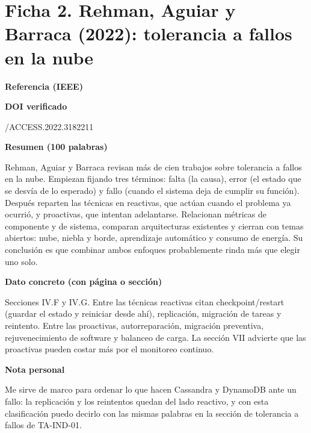 \documentclass[11pt,a4paper]{article}
\newcommand{\campo}[1]{\par\medskip\noindent\textbf{#1}\par\smallskip}
\begin{document}
	\newpage \section*{Ficha 2. Rehman, Aguiar y Barraca (2022): tolerancia a fallos en la nube}
	\campo{Referencia (IEEE)}
	\campo{DOI verificado}
	10.1109/ACCESS.2022.3182211
	\campo{Resumen (100 palabras)}
	Rehman, Aguiar y Barraca revisan más de cien trabajos sobre tolerancia a fallos en la nube. Empiezan fijando tres términos: falta (la causa), error (el estado que se desvía de lo esperado) y fallo (cuando el sistema deja de cumplir su función). Después reparten las técnicas en reactivas, que actúan cuando el problema ya ocurrió, y proactivas, que intentan adelantarse. Relacionan métricas de componente y de sistema, comparan arquitecturas existentes y cierran con temas abiertos: nube, niebla y borde, aprendizaje automático y consumo de energía. Su conclusión es que combinar ambos enfoques probablemente rinda más que elegir uno solo.
	\campo{Dato concreto (con p\'agina o secci\'on)}
	Secciones IV.F y IV.G. Entre las técnicas reactivas citan checkpoint/restart (guardar el estado y reiniciar desde ahí), replicación, migración de tareas y reintento. Entre las proactivas, autorreparación, migración preventiva, rejuvenecimiento de software y balanceo de carga. La sección VII advierte que las proactivas pueden costar más por el monitoreo continuo.
	\campo{Nota personal}
	Me sirve de marco para ordenar lo que hacen Cassandra y DynamoDB ante un fallo: la replicación y los reintentos quedan del lado reactivo, y con esta clasificación puedo decirlo con las mismas palabras en la sección de tolerancia a fallos de TA-IND-01.
	
\end{document}
